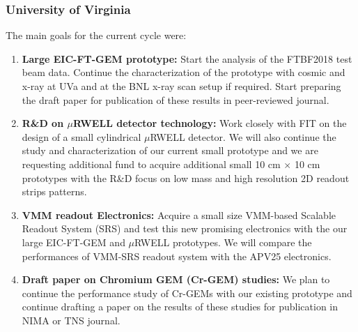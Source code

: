 \subsubsection{University of Virginia} 
The main goals for the current cycle were:

%
\begin{enumerate}[leftmargin=*]
\item \textbf{Large EIC-FT-GEM prototype:} Start the analysis of the FTBF2018 test beam  data. Continue the characterization of the prototype with cosmic and x-ray at UVa and at the BNL x-ray scan setup if required.  Start preparing the draft paper for publication of these results in peer-reviewed journal. 
%
\item \textbf{R\&D on $\mu$RWELL detector technology:} Work closely with FIT on the design of a small cylindrical  $\mu$RWELL detector. We will also continue the study and characterization of our current small prototype and we are requesting additional fund to acquire additional small  10 cm $\times$ 10 cm prototypes with the R\&D focus on low mass and high resolution 2D readout strips patterns.
%
\item \textbf{VMM readout Electronics:} Acquire a small size VMM-based Scalable Readout System (SRS) and test this new promising electronics with the our large EIC-FT-GEM and  $\mu$RWELL prototypes. We will compare the performances of VMM-SRS readout system with the APV25 electronics.
%
\item \textbf{Draft paper on Chromium GEM (Cr-GEM) studies:} We plan to continue the performance study of Cr-GEMs with our existing prototype and continue drafting a paper on the results of these studies for publication in NIMA or TNS journal.
\end{enumerate}

